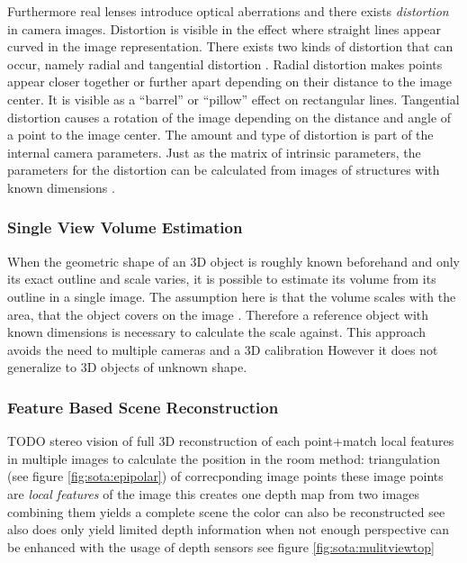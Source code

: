 Furthermore real lenses introduce optical aberrations and 
there exists \emph{distortion} in camera images.
Distortion is visible in the effect where straight lines appear curved in the image representation.
There exists two kinds of distortion that can occur, namely radial and tangential distortion \autocite[][Fig.~2]{weng1992distortion}.
Radial distortion makes points appear closer together or further apart depending on their distance to the image center. 
It is visible as a \enquote{barrel} or \enquote{pillow} effect on rectangular lines. 
Tangential distortion causes a rotation of the image depending on the distance and angle of a point to the image center.
The amount and type of distortion is part of the internal camera parameters.
Just as the matrix of intrinsic parameters, the parameters for the distortion can be calculated from images of structures with known dimensions
\autocite{opencv2018calibration}.

\subsubsection{Single View Volume Estimation}
When the geometric shape of an \ac{3D} object is roughly known beforehand and only its exact outline and scale varies, it is possible to estimate its volume from its outline in a single image.
The assumption here is that the volume scales with the area, that the object covers on the image \autocite{levine1989microwave} \autocite[][]{wang2017apple} \autocite[][]{sapkal2017volume} .
Therefore a reference object with known dimensions is necessary to calculate the scale against.
This approach avoids the need to multiple cameras and a \ac{3D} calibration
However it does not generalize to \ac{3D} objects of unknown shape.

\subsubsection{Feature Based Scene Reconstruction} 
TODO
stereo vision
of full \ac{3D} reconstruction of each point+match local features in multiple images to calculate the position in the room
method: triangulation (see figure \ref{fig:sota:epipolar}) of correcponding image points
these image points are \emph{local features} of the image
this creates one depth map from two images
combining them yields a complete scene
the color can also be reconstructed
see also
\autocite[][]{dyer2001reconstruction}
\autocite[][Chap.~3]{zhang2017imageunderstanding}
does only yield limited depth information when not enough perspective
can be enhanced with the usage of depth sensors
see figure \ref{fig:sota:mulitviewtop}

